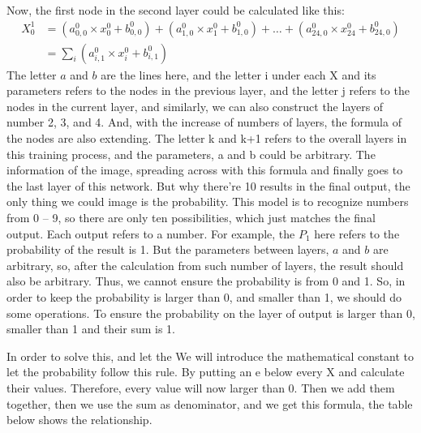 \documentclass[12pt]{article}
\begin{document}
Now, the first node in the second layer could be calculated like this: 
\begin{align}
X^1_{0} &= (a^0_{0,0} \times x^0_{0} + b^0_{0,0}) + (a^0_{1,0} \times x^0_{1} + b^0_{1,0}) + \ldots + (a^0_{24,0} \times x^0_{24} + b^0_{24,0}) \\
&= \sum_{i} (a^0_{i,1} \times x^0_{i} + b^0_{i,1})
\end{align}
The letter $a$ and $b$ are the lines here, and the letter i under each X and its parameters refers to the nodes in the previous layer, and the letter j refers to the nodes in the current layer, and similarly, we can also construct the layers of number 2, 3, and 4. And, with the increase of numbers of layers, the formula of the nodes are also extending. The letter k and k+1 refers to the overall layers in this training process, and the parameters, a and b could be arbitrary. The information of the image, spreading across with this formula and finally goes to the last layer of this network. But why there’re 10 results in the final output, the only thing we could image is the probability. This model is to recognize numbers from 0 – 9, so there are only ten possibilities, which just matches the final output. Each output refers to a number. For example, the $P_1$ here refers to the probability of the result is 1. But the parameters between layers, $a$ and $b$ are arbitrary, so, after the calculation from such number of layers, the result should also be arbitrary. Thus, we cannot ensure the probability is from 0 and 1. So, in order to keep the probability is larger than 0, and smaller than 1, we should do some operations. To ensure the probability on the layer of output is larger than 0, smaller than 1 and their sum is 1.

In order to solve this, and let the We will introduce  the mathematical constant to let the probability follow this rule. By putting an e below every X and calculate their values. Therefore, every value will now larger than 0. Then we add them together, then we use the sum as denominator, and we get this formula, the table below shows the relationship.

\begin{table}[h!]
\centering
{}
\caption{Softmax Normalization}
\label{table:your_label}
\end{table}
\end{document}
